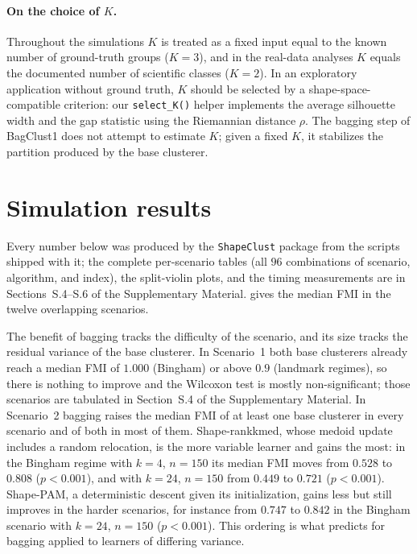 \documentclass[review,11pt,3p,authoryear]{elsarticle}
\newcommand{\ShapeClust}{\texttt{ShapeClust}}
\begin{document}
\paragraph{On the choice of $K$.}
Throughout the simulations $K$ is treated as a fixed input equal to
the known number of ground-truth groups ($K=3$), and in the real-data
analyses $K$ equals the documented number of scientific classes
($K=2$). In an exploratory application without ground truth, $K$
should be selected by a shape-space-compatible criterion: our
\texttt{select\_K()} helper implements the average silhouette width
\citep{rousseeuw1990finding} and the gap statistic
\citep{tibshirani2001estimating} using the Riemannian distance
$\rho$. The bagging step of BagClust1 does not attempt to estimate
$K$; given a fixed $K$, it stabilizes the partition produced by the
base clusterer.


\section{Simulation results}
\label{sec:results}

Every number below was produced by the \ShapeClust{} package from the
scripts shipped with it; the complete per-scenario tables (all $96$
combinations of scenario, algorithm, and index), the split-violin plots, and
the timing measurements are in Sections~S.4--S.6 of the Supplementary
Material.  gives the median FMI in the twelve
overlapping scenarios.

The benefit of bagging tracks the difficulty of the scenario, and its size
tracks the residual variance of the base clusterer. In Scenario~1 both
base clusterers already reach a median FMI of $1.000$ (Bingham) or above
$0.9$ (landmark regimes), so there is nothing to improve and the Wilcoxon
test is mostly non-significant; those scenarios are tabulated in
Section~S.4 of the Supplementary Material. In Scenario~2 bagging raises the median FMI of at least one
base clusterer in every scenario and of both in most of them. Shape-rankkmed,
whose medoid update includes a random relocation, is the more variable
learner and gains the most: in the Bingham regime with $k=4$, $n=150$ its
median FMI moves from $0.528$ to $0.808$ ($p<0.001$), and with $k=24$,
$n=150$ from $0.449$ to $0.721$ ($p<0.001$). Shape-PAM, a deterministic
descent given its initialization, gains less but still improves in the
harder scenarios, for instance from $0.747$ to $0.842$ in the Bingham scenario
with $k=24$, $n=150$ ($p<0.001$). This ordering is what
\citet{breiman1996bagging} predicts for bagging applied to learners of
differing variance.
\end{document}
